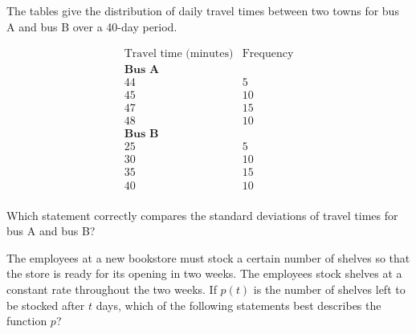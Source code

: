 \noindent\markforreview
\vspace{1em}

The tables give the distribution of daily travel times between two towns for bus A and bus B over a 40-day period.

\[
\begin{array}{c|c}
\text{Travel time (minutes)} & \text{Frequency} \\
\hline
\textbf{Bus A} & \\
44 & 5 \\
45 & 10 \\
47 & 15 \\
48 & 10 \\
\hline
\textbf{Bus B} & \\
25 & 5 \\
30 & 10 \\
35 & 15 \\
40 & 10 \\
\end{array}
\]

Which statement correctly compares the standard deviations of travel times for bus A and bus B?


\vspace{2em}

\noindent\markforreview
\vspace{1em}

The employees at a new bookstore must stock a certain number of shelves so that the store is ready for its opening in two weeks. The employees stock shelves at a constant rate throughout the two weeks. If $p(t)$ is the number of shelves left to be stocked after $t$ days, which of the following statements best describes the function $p$?

